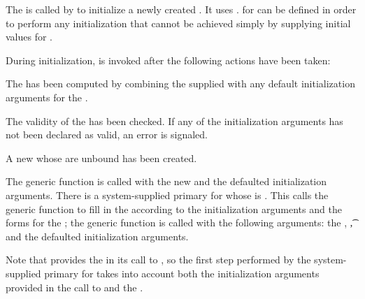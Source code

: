 \endsubsection%

                      
The   is called by 
 to initialize a newly created .
It uses .   for 
 can be defined in order to perform any
initialization that cannot be achieved 
simply by supplying initial values for .

                        
During initialization,  is invoked
after the following actions have been taken:

\beginlist 

\itemitem{\bull} The  
has been computed by combining the supplied  
with any default initialization arguments for the .

\itemitem{\bull} The validity of the 
has been checked.  If any of the initialization arguments has not
been declared as valid, an error is signaled. 

\itemitem{\bull} A new  whose  
are unbound has been created.

\endlist
                      
The generic function  is called with the
new  and the defaulted initialization arguments.  There is
a system-supplied primary  for 
whose  is .  This
 calls the generic function 
 to fill in
the  according to the initialization arguments and the 
 forms for the ; the generic function 
 is called with the following arguments: the ,
\t, and the defaulted initialization arguments.
           
Note that  provides the 
 in its call to ,
so the first step performed by the system-supplied primary  for
 takes into account both the initialization
arguments provided in the call to  and the
.

